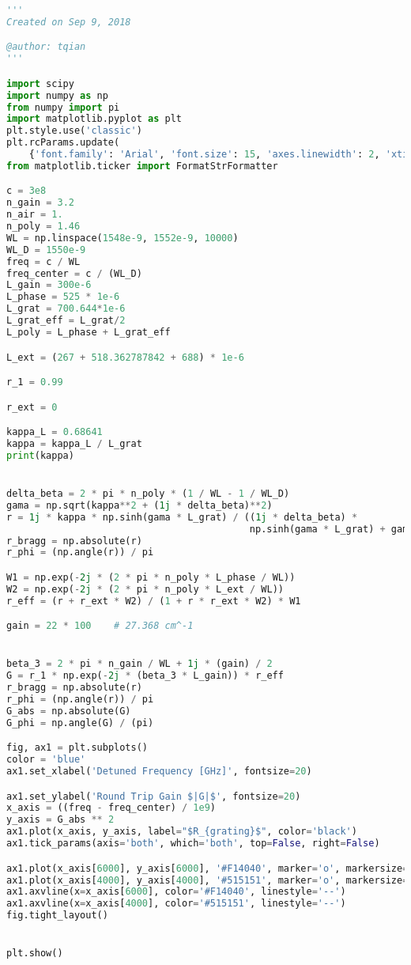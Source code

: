 \begin{lstlisting}[language=Python, basicstyle=\tiny]
'''
Created on Sep 9, 2018

@author: tqian
'''

import scipy
import numpy as np
from numpy import pi
import matplotlib.pyplot as plt
plt.style.use('classic')
plt.rcParams.update(
    {'font.family': 'Arial', 'font.size': 15, 'axes.linewidth': 2, 'xtick.major.width': 2, 'ytick.major.width': 2})
from matplotlib.ticker import FormatStrFormatter

c = 3e8
n_gain = 3.2
n_air = 1.
n_poly = 1.46
WL = np.linspace(1548e-9, 1552e-9, 10000)
WL_D = 1550e-9
freq = c / WL
freq_center = c / (WL_D)
L_gain = 300e-6
L_phase = 525 * 1e-6
L_grat = 700.644*1e-6
L_grat_eff = L_grat/2
L_poly = L_phase + L_grat_eff

L_ext = (267 + 518.362787842 + 688) * 1e-6

r_1 = 0.99

r_ext = 0

kappa_L = 0.68641
kappa = kappa_L / L_grat
print(kappa)


delta_beta = 2 * pi * n_poly * (1 / WL - 1 / WL_D)
gama = np.sqrt(kappa**2 + (1j * delta_beta)**2)
r = 1j * kappa * np.sinh(gama * L_grat) / ((1j * delta_beta) *
                                           np.sinh(gama * L_grat) + gama * np.cosh(gama * L_grat))
r_bragg = np.absolute(r)
r_phi = (np.angle(r)) / pi

W1 = np.exp(-2j * (2 * pi * n_poly * L_phase / WL))
W2 = np.exp(-2j * (2 * pi * n_poly * L_ext / WL))
r_eff = (r + r_ext * W2) / (1 + r * r_ext * W2) * W1

gain = 22 * 100    # 27.368 cm^-1


beta_3 = 2 * pi * n_gain / WL + 1j * (gain) / 2
G = r_1 * np.exp(-2j * (beta_3 * L_gain)) * r_eff
r_bragg = np.absolute(r)
r_phi = (np.angle(r)) / pi
G_abs = np.absolute(G)
G_phi = np.angle(G) / (pi)

fig, ax1 = plt.subplots()
color = 'blue'
ax1.set_xlabel('Detuned Frequency [GHz]', fontsize=20)

ax1.set_ylabel('Round Trip Gain $|G|$', fontsize=20)
x_axis = ((freq - freq_center) / 1e9)
y_axis = G_abs ** 2
ax1.plot(x_axis, y_axis, label="$R_{grating}$", color='black')
ax1.tick_params(axis='both', which='both', top=False, right=False)

ax1.plot(x_axis[6000], y_axis[6000], '#F14040', marker='o', markersize=10)
ax1.plot(x_axis[4000], y_axis[4000], '#515151', marker='o', markersize=10)
ax1.axvline(x=x_axis[6000], color='#F14040', linestyle='--')
ax1.axvline(x=x_axis[4000], color='#515151', linestyle='--')
fig.tight_layout()


plt.show()
\end{lstlisting}


